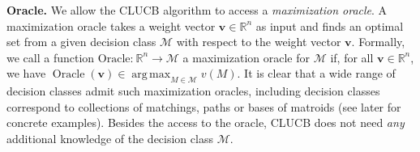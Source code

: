 \documentclass{article}
\newcommand{\Algorithm}{{\small \textsf{CLUCB}}\xspace}
\newcommand{\M}{\mathcal M}
\newcommand{\RR}{\mathbb R}
\DeclareMathOperator*{\argmax}{arg\,max}
\DeclareMathOperator{\Oracle}{Oracle}
\renewcommand{\vec}[1]{\boldsymbol{#1}}
\begin{document}
\textbf{Oracle.}
We allow the \Algorithm algorithm to access a \emph{maximization oracle}. 
A maximization oracle takes a weight vector $\vec v \in \RR^{n}$ as input and finds an optimal set from a given decision class $\M$ with respect to the weight vector $\vec v$.
Formally, we call a function $\text{Oracle:}~\RR^{n} \rightarrow \M$ a maximization oracle for $\M$ if, for all $\vec v\in \RR^{n}$, we have $\Oracle(\vec v) \in \argmax_{M\in \M} v(M)$.
It is clear that a wide range of decision classes admit such maximization oracles, including decision classes correspond to collections of matchings, paths or bases of matroids (see later for concrete examples).
Besides the access to the oracle, \Algorithm does not need \emph{any} additional knowledge of the decision class $\M$.

\end{document}
